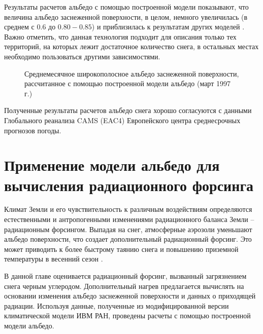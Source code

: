\documentclass[a4paper, fontsize=14pt]{scrartcl}
\begin{document}
Результаты расчетов альбедо с помощью построенной модели показывают, что величина альбедо заснеженной поверхности, в целом, немного увеличилась (в среднем с $0.6$ до $0.80-0.85$) и приблизилась к результатам других моделей \cite{Flanner2007, Gueymard2019}. Важно отметить, что данная технология подходит для описания только тех территорий, на которых лежит достаточное количество снега, в остальных местах необходимо пользоваться другими зависимостями.

\begin{figure}[h]
    \caption{Среднемесячное широкополосное альбедо заснеженной поверхности, рассчитанное с помощью построенной модели альбедо (март 1997 г.)}
    \label{fig:imageAlbOld}
\end{figure}

Полученные результаты расчетов альбедо снега хорошо согласуются с данными Глобального реанализа CAMS (EAC4) Европейского центра среднесрочных прогнозов погоды.


\newpage
\section{Применение модели альбедо для вычисления радиационного форсинга}

Климат Земли и его чувствительность к различным воздействиям определяются естественными и антропогенными изменениями радиационного баланса Земли -- радиационным форсингом. Выпадая на снег, атмосферные аэрозоли уменьшают альбедо поверхности, что создает дополнительный радиационный форсинг. Это может приводить к более быстрому таянию снега и повышению приземной температуры в весенний сезон \cite{Chernenkov2021rus}. 

В данной главе оценивается радиационный форсинг, вызванный загрязнением снега черным углеродом. Дополнительный нагрев предлагается вычислять на основании изменения альбедо заснеженной поверхности и данных о приходящей радиации. Используя данные, полученные из модифицированной версии климатической модели ИВМ РАН, проведены расчеты с помощью построенной модели альбедо.
\end{document}
